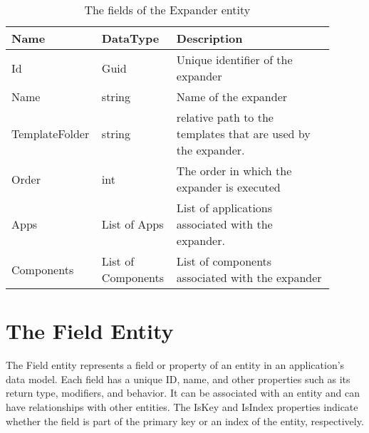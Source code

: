 \begin{table}[H]
\small
\begin{tabular}{ p{0.20\linewidth} p{0.22\linewidth} p{0.48\linewidth} }
\hline
\textbf{Name} & \textbf{DataType} & \textbf{Description} \\
\hline
Id & Guid & Unique identifier of the expander \\
Name & string & Name of the expander \\
TemplateFolder & string & relative path to the templates that are used by the expander. \\
Order & int & The order in which the expander is executed \\
Apps & List of Apps & List of applications associated with the expander. \\
Components & List of Components & List of components associated with the expander \\
\hline
\end{tabular}
\caption{The fields of the Expander entity}
\label{table:expander_entity}
\end{table}

\section{The Field Entity}

The Field entity represents a field or property of an entity in an application's data
model. Each field has a unique ID, name, and other properties such as its return type,
modifiers, and behavior. It can be associated with an entity and can have relationships
with other entities. The IsKey and IsIndex properties indicate whether the field is part
of the primary key or an index of the entity, respectively.

